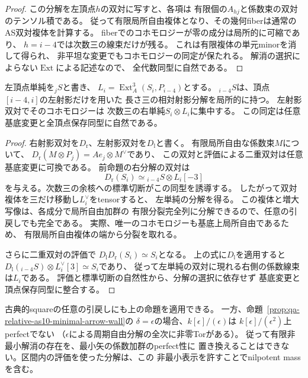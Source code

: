 \begin{proof}
この分解を左頂点$h$の双対に写すと、各項は
有限個の$A_{hj}$と係数束の双対のテンソル積である。
従って有限局所自由複体となり、その幾何fiberは通常の
AS双対複体を計算する。
fiberでのコホモロジーが零の成分は局所的に可縮であり、
$h=i-4$では次数三の線束だけが残る。
これは有限複体の単元minorを消して得られ、
非平坦な変更でもコホモロジーの同定が保たれる。
解消の選択によらない$\operatorname{Ext}$による記述なので、
全代数同型に自然である。
\end{proof}

\begin{corollary}[左単純の相対分解と二重双対]
\label{cor:qa-relative-as-left-simple-duality}
左頂点単純を\({}_jS\)と書き、
$L_i=\operatorname{Ext}^3_A(S_i,P_{i-4})$とする。
\({}_{i-4}S\)は、頂点$[i-4,i]$の左射影だけを用いた
長さ三の相対射影分解を局所的に持つ。
左射影双対でそのコホモロジーは
次数三の右単純$S_i\otimes L_i$に集中する。
この同定は任意基底変更と全頂点保存同型に自然である。
\end{corollary}
\begin{proof}
右射影双対を$D_{\mathrm{r}}$、左射影双対を$D_{\mathrm{l}}$と書く。
有限局所自由な係数束$M$について、
$D_{\mathrm{r}}(M\otimes P_j)=Ae_j\otimes M^\vee$であり、
この双対と評価による二重双対は任意基底変更に可換である。
前命題の右分解の双対は
\[
 D_{\mathrm{r}}(S_i)\simeq {}_{i-4}S\otimes L_i[-3]
\]
を与える。次数三の余核への標準切断がこの同型を誘導する。
したがって双対複体を三だけ移動し$L_i^\vee$をtensorすると、
左単純の分解を得る。
この複体と増大写像は、各成分で局所自由加群の
有限分裂完全列に分解できるので、任意の引戻しでも完全である。
実際、唯一のコホモロジーも基底上局所自由であるため、
有限局所自由複体の端から分裂を取れる。

さらに二重双対の評価で
$D_{\mathrm{l}}D_{\mathrm{r}}(S_i)\simeq S_i$となる。
上の式に$D_{\mathrm{l}}$を適用すると
$D_{\mathrm{l}}({}_{i-4}S)\otimes L_i^\vee[3]\simeq S_i$であり、
従って左単純の双対に現れる右側の係数線束は$L_i$である。
評価と標準切断の自然性から、分解の選択に依存せず
基底変更と頂点保存同型に整合する。
\end{proof}

古典的squareの任意の引戻しにも上の命題を適用できる。
一方、命題~\ref{prop:qa-relative-as10-minimal-arrow-wall}の
$\delta=\epsilon$の場合、$k[\epsilon]/(\epsilon)$は
$k[\epsilon]/(\epsilon^2)$上perfectでない
（$\epsilon$による周期自由分解の全次に非零Torがある）。
従って有限非最小解消の存在を、最小矢の係数加群のperfect性に
置き換えることはできない。区間内の評価を使った分解は、この
非最小表示を許すことでnilpotent massを含む。

